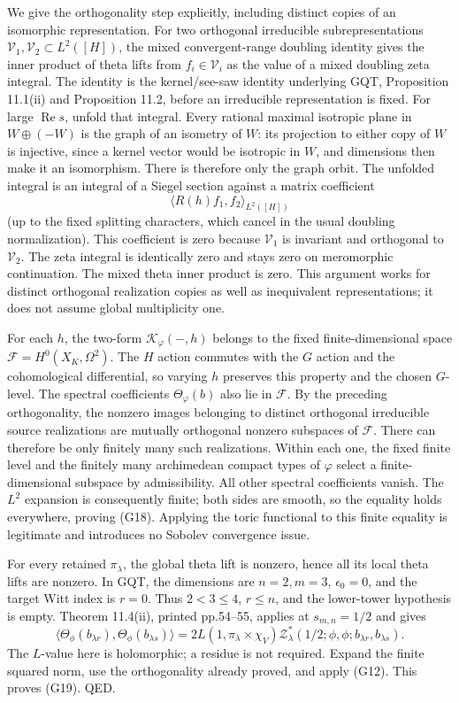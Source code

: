 We give the orthogonality step explicitly, including distinct copies of an isomorphic representation. For two orthogonal irreducible subrepresentations \(\mathcal V_1,\mathcal V_2\subset L^2([H])\), the mixed convergent-range doubling identity gives the inner product of theta lifts from \(f_i\in\mathcal V_i\) as the value of a mixed doubling zeta integral. The identity is the kernel/see-saw identity underlying GQT, Proposition 11.1(ii) and Proposition 11.2, before an irreducible representation is fixed. For large \(\operatorname{Re}s\), unfold that integral. Every rational maximal isotropic plane in \(W\oplus(-W)\) is the graph of an isometry of \(W\): its projection to either copy of \(W\) is injective, since a kernel vector would be isotropic in \(W\), and dimensions then make it an isomorphism. There is therefore only the graph orbit. The unfolded integral is an integral of a Siegel section against a matrix coefficient \[
\langle R(h)f_1,f_2\rangle_{L^2([H])}
\] (up to the fixed splitting characters, which cancel in the usual doubling normalization). This coefficient is zero because \(\mathcal V_1\) is invariant and orthogonal to \(\mathcal V_2\). The zeta integral is identically zero and stays zero on meromorphic continuation. The mixed theta inner product is zero. This argument works for distinct orthogonal realization copies as well as inequivalent representations; it does not assume global multiplicity one.

For each \(h\), the two-form \(\mathcal K_\varphi(-,h)\) belongs to the fixed finite-dimensional space \(\mathcal F=H^0(X_K,\Omega^2)\). The \(H\) action commutes with the \(G\) action and the cohomological differential, so varying \(h\) preserves this property and the chosen \(G\)-level. The spectral coefficients \(\Theta_\varphi(b)\) also lie in \(\mathcal F\). By the preceding orthogonality, the nonzero images belonging to distinct orthogonal irreducible source realizations are mutually orthogonal nonzero subspaces of \(\mathcal F\). There can therefore be only finitely many such realizations. Within each one, the fixed finite level and the finitely many archimedean compact types of \(\varphi\) select a finite-dimensional subspace by admissibility. All other spectral coefficients vanish. The \(L^2\) expansion is consequently finite; both sides are smooth, so the equality holds everywhere, proving (G18). Applying the toric functional to this finite equality is legitimate and introduces no Sobolev convergence issue.

For every retained \(\pi_\lambda\), the global theta lift is nonzero, hence all its local theta lifts are nonzero. In GQT, the dimensions are \(n=2,m=3\), \(\epsilon_0=0\), and the target Witt index is \(r=0\). Thus \(2<3\le4\), \(r\le n\), and the lower-tower hypothesis is empty. Theorem 11.4(ii), printed pp.54--55, applies at \(s_{m,n}=1/2\) and gives \[
\langle\Theta_\phi(b_{\lambda r}),\Theta_\phi(b_{\lambda s})\rangle
=2L(1,\pi_\lambda\times\chi_V)
\mathcal Z^*_{\lambda}(1/2;\phi,\phi;b_{\lambda r},b_{\lambda s}).
\] The \(L\)-value here is holomorphic; a residue is not required. Expand the finite squared norm, use the orthogonality already proved, and apply (G12). This proves (G19). QED.

